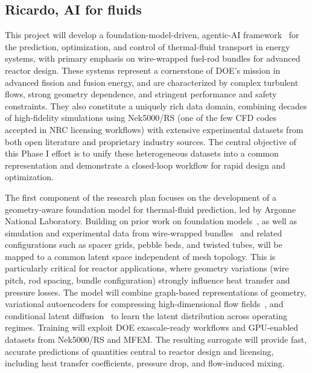 \subsection{Ricardo, AI for fluids}

This project will develop a foundation-model-driven, agentic-AI framework~\cite{Vinuesa2026XAI} for the prediction, optimization, and control of thermal-fluid transport in energy systems, with primary emphasis on wire-wrapped fuel-rod bundles for advanced reactor design. These systems represent a cornerstone of DOE’s mission in advanced fission and fusion energy, and are characterized by complex turbulent flows, strong geometry dependence, and stringent performance and safety constraints. They also constitute a uniquely rich data domain, combining decades of high-fidelity simulations using Nek5000/RS (one of the few CFD codes accepted in NRC licensing workflows) with extensive experimental datasets from both open literature and proprietary industry sources. The central objective of this Phase I effort is to unify these heterogeneous datasets into a common representation and demonstrate a closed-loop workflow for rapid design and optimization.

The first component of the research plan focuses on the development of a geometry-aware foundation model for thermal-fluid prediction, led by Argonne National Laboratory. Building on prior work on foundation models~\cite{Vishwasrao2026AgenticPDE}, as well as simulation and experimental data from wire-wrapped bundles~\cite{Collins2022WireCoil} and related configurations such as spacer grids, pebble beds, and twisted tubes, will be mapped to a common latent space independent of mesh topology. This is particularly critical for reactor applications, where geometry variations (wire pitch, rod spacing, bundle configuration) strongly influence heat transfer and pressure losses. The model will combine graph-based representations of geometry, variational autoencoders for compressing high-dimensional flow fields~\cite{Vinuesa2022MLCFD,SoleraRico2024BetaVAE}, and conditional latent diffusion~\cite{Vishwasrao2025DiffSPORT} to learn the latent distribution across operating regimes. Training will exploit DOE exascale-ready workflows and GPU-enabled datasets from Nek5000/RS and MFEM. The resulting surrogate will provide fast, accurate predictions of quantities central to reactor design and licensing, including heat transfer coefficients, pressure drop, and flow-induced mixing.

